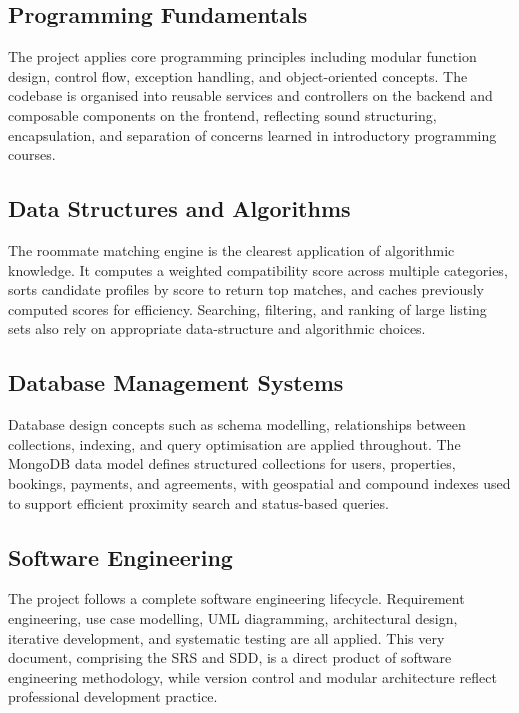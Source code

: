 \subsection{Programming Fundamentals}

The project applies core programming principles including modular function design, control flow, exception handling, and object-oriented concepts. The codebase is organised into reusable services and controllers on the backend and composable components on the frontend, reflecting sound structuring, encapsulation, and separation of concerns learned in introductory programming courses.

\subsection{Data Structures and Algorithms}

The roommate matching engine is the clearest application of algorithmic knowledge. It computes a weighted compatibility score across multiple categories, sorts candidate profiles by score to return top matches, and caches previously computed scores for efficiency. Searching, filtering, and ranking of large listing sets also rely on appropriate data-structure and algorithmic choices.

\subsection{Database Management Systems}

Database design concepts such as schema modelling, relationships between collections, indexing, and query optimisation are applied throughout. The MongoDB data model defines structured collections for users, properties, bookings, payments, and agreements, with geospatial and compound indexes used to support efficient proximity search and status-based queries.

\subsection{Software Engineering}

The project follows a complete software engineering lifecycle. Requirement engineering, use case modelling, UML diagramming, architectural design, iterative development, and systematic testing are all applied. This very document, comprising the SRS and SDD, is a direct product of software engineering methodology, while version control and modular architecture reflect professional development practice.

